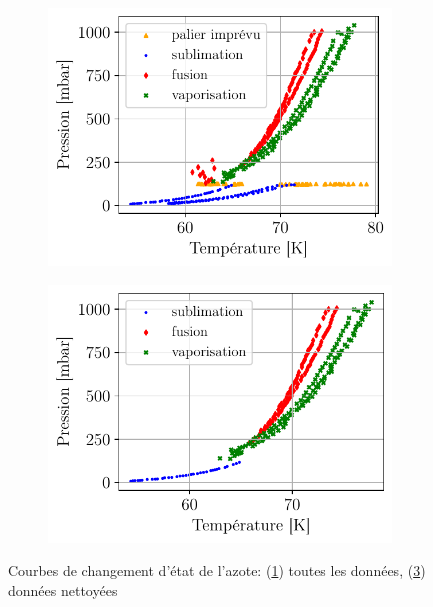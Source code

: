 \begin{figure}[h]
    \centering
    \begin{subfigure}[c]{0.5\linewidth}
        \centering
        \includegraphics[width=\linewidth]{figures/etats_azote_all_data.pdf}
        \caption{}
        \label{fig:alldata}
    \end{subfigure}%
    \begin{subfigure}[c]{0.5\linewidth}
        \centering
        \includegraphics[width=\linewidth]{figures/etats_azote_clean.pdf}
        \caption{}
        \label{fig:cleandata}
    \end{subfigure}
    \caption{Courbes de changement d'état de l'azote: (\ref{fig:alldata}) toutes les données, (\ref{fig:cleandata}) données nettoyées}
\end{figure}


